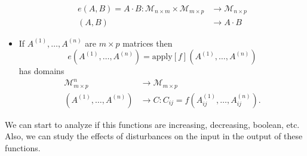 \begin{itemize}
\begin{align*}
			e(A, B)=A\cdot B:\mathcal{M}_{n\times m}\times\mathcal{M}_{m\times p}&\rightarrow \mathcal{M}_{n\times p} \\
			(A, B)&\rightarrow A\cdot B
		\end{align*}
	\item If $A^{(1)}, \ldots, A^{(n)}$ are $m\times p$ matrices then $$e(A^{(1)}, \ldots, A^{(n)})=\text{apply}[f](A^{(1)}, \ldots, A^{(n)})$$ has domains
		\begin{align*}
			\mathcal{M}_{m\times p}^n&\rightarrow \mathcal{M}_{m\times p} \\
			(A^{(1)}, \ldots, A^{(n)})&\rightarrow C:C_{ij}=f(A^{(1)}_{ij}, \ldots, A^{(n)}_{ij}).
		\end{align*}
\end{itemize}

We can start to analyze if this functions are increasing, decreasing, boolean, etc. Also, we can study the effects of disturbances on the input in the output of these functions.